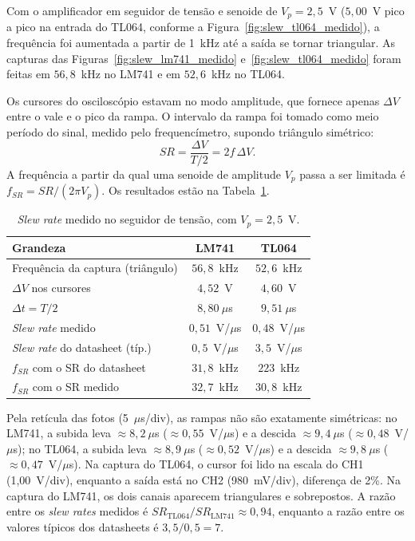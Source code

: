 \documentclass[11pt,a4paper]{article}
\begin{document}
Com o amplificador em seguidor de tensão e senoide de $V_p=2{,}5$~V ($5{,}00$~V pico a pico na entrada do TL064, conforme a Figura~\ref{fig:slew_tl064_medido}), a frequência foi aumentada a partir de 1~kHz até a saída se tornar triangular. As capturas das Figuras~\ref{fig:slew_lm741_medido} e~\ref{fig:slew_tl064_medido} foram feitas em $56{,}8$~kHz no LM741 e em $52{,}6$~kHz no TL064.

Os cursores do osciloscópio estavam no modo amplitude, que fornece apenas $\Delta V$ entre o vale e o pico da rampa. O intervalo da rampa foi tomado como meio período do sinal, medido pelo frequencímetro, supondo triângulo simétrico:
\[
SR=\frac{\Delta V}{T/2}=2f\,\Delta V.
\]
A frequência a partir da qual uma senoide de amplitude $V_p$ passa a ser limitada é $f_{SR}=SR/(2\pi V_p)$. Os resultados estão na Tabela~\ref{tab:slew_equipe}.

\begin{table}[H]
\centering
\caption{\textit{Slew rate} medido no seguidor de tensão, com $V_p=2{,}5$~V.}
\label{tab:slew_equipe}
\renewcommand{\arraystretch}{1.2}
\begin{tabular}{@{}lcc@{}}
\toprule
\textbf{Grandeza} & \textbf{LM741} & \textbf{TL064} \\
\midrule
Frequência da captura (triângulo) & $56{,}8$~kHz & $52{,}6$~kHz \\
$\Delta V$ nos cursores & $4{,}52$~V & $4{,}60$~V \\
$\Delta t=T/2$ & $8{,}80~\mu$s & $9{,}51~\mu$s \\
\textit{Slew rate} medido & $0{,}51$~V/$\mu$s & $0{,}48$~V/$\mu$s \\
\textit{Slew rate} do datasheet (típ.) & $0{,}5$~V/$\mu$s & $3{,}5$~V/$\mu$s \\
$f_{SR}$ com o SR do datasheet & $31{,}8$~kHz & $223$~kHz \\
$f_{SR}$ com o SR medido & $32{,}7$~kHz & $30{,}8$~kHz \\
\bottomrule
\end{tabular}
\end{table}

Pela retícula das fotos (5~$\mu$s/div), as rampas não são exatamente simétricas: no LM741, a subida leva $\approx8{,}2~\mu$s ($\approx0{,}55$~V/$\mu$s) e a descida $\approx9{,}4~\mu$s ($\approx0{,}48$~V/$\mu$s); no TL064, a subida leva $\approx8{,}9~\mu$s ($\approx0{,}52$~V/$\mu$s) e a descida $\approx9{,}8~\mu$s ($\approx0{,}47$~V/$\mu$s). Na captura do TL064, o cursor foi lido na escala do CH1 (1,00~V/div), enquanto a saída está no CH2 (980~mV/div), diferença de 2\%. Na captura do LM741, os dois canais aparecem triangulares e sobrepostos. A razão entre os \textit{slew rates} medidos é $SR_{\mathrm{TL064}}/SR_{\mathrm{LM741}}\approx0{,}94$, enquanto a razão entre os valores típicos dos datasheets é $3{,}5/0{,}5=7$.
\end{document}
